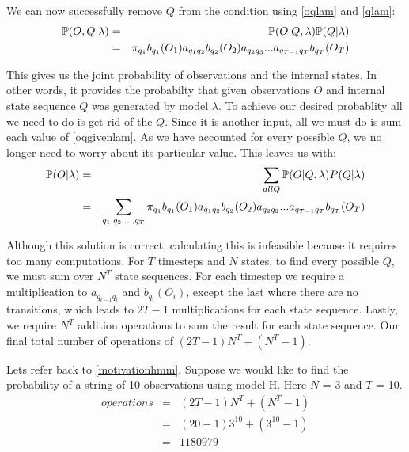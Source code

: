 We can now successfully remove $Q$ from the condition using \ref{oqlam} and \ref{qlam}:
\begin{eqnarray}
    \label{oqgivenlam}
    \mathbb{P} (O,Q | \lambda) & = & \mathbb{P}(O | Q, \lambda) \mathbb{P}(Q | \lambda) \\
                          & = & \pi_{q_1} b_{q_1}(O_1) a_{q_1q_2} b_{q_2}(O_2) a_{q_2q_3} ... a_{q_{T-1}q_T} b_{q_T}(O_T)
\end{eqnarray}

This gives us the joint probability of observations and the internal states. In other words, it provides the probabilty that given observations $O$ and internal state sequence $Q$ was generated by model $\lambda$. To achieve our desired probablity all we need to do is get rid of the $Q$. Since it is another input, all we must do is sum each value of \ref{oqgivenlam}. As we have accounted for every possible $Q$, we no longer need to worry about its particular value. This leaves us with:
\begin{eqnarray}
    \label{ogivenlamsumq}
    \mathbb{P} (O | \lambda) & = & \sum_{all Q} \mathbb{P}(O| Q,\lambda)P(Q|\lambda) \\
                        & = & \sum_{q_1,q_2,...,q_T} \pi_{q_1} b_{q_1}(O_1) a_{q_1q_2} b_{q_2}(O_2) a_{q_2q_3} ... a_{q_{T-1}q_T} b_{q_T}(O_T)
\end{eqnarray} 

Although this solution is correct, calculating this is infeasible because it requires too many computations. For $T$ timesteps and $N$ states, to find every possible $Q$, we must sum over $N^T$ state sequences. For each timestep we require a multiplication to $a_{q_{i-1}q_{i}}$ and $b_{q_i}(O_i)$, except the last where there are no transitions, which leads to $2T-1$ multiplications for each state sequence. Lastly, we require $N^T$ addition operations to sum the result for each state sequence. Our final total number of operations of $(2T-1)N^T + (N^T-1)$. 

\begin{example}
    \label{motivfb}
    Lets refer back to \ref{motivationhmm}. Suppose we would like to find the probability of a string of 10 observations using model H. Here $N$ = 3 and $T$ = 10. 
    \begin{eqnarray}
        operations & = & (2T-1)N^T + (N^T-1) \\
                   & = & (20-1)3^10 + (3^10 -1) \\
                   & = & 1180979
    \end{eqnarray}
\end{example}


